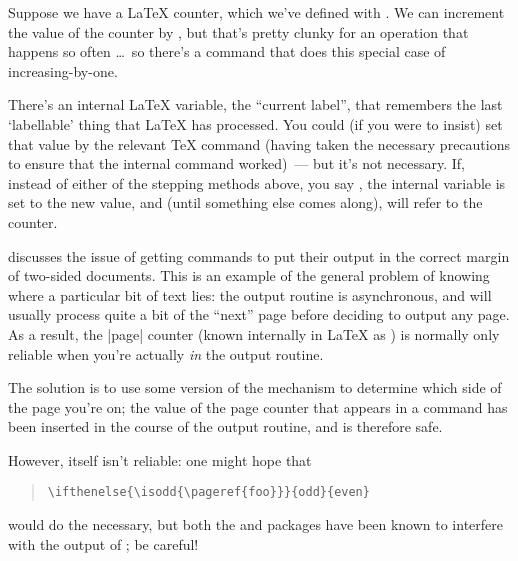 
Suppose we have a \LaTeX{} counter, which we've defined with
.  We can increment the value of the counter
by , but that's pretty clunky for an
operation that happens so often \dots{}~so there's a command
 that does this special case of
increasing-by-one.

There's an internal \LaTeX{} variable, the ``current label'', that
remembers the last `labellable' thing that \LaTeX{} has processed.
You could (if you were to insist) set that value by the relevant
\TeX{} command (having taken the necessary precautions to ensure that
the internal command worked)~--- but it's not necessary.  If, instead
of either of the stepping methods above, you say
, the internal variable is set to the
new value, and (until something else comes along),  will
refer to the counter.


 discusses the issue
of getting  commands to put their output in the correct
margin of two-sided documents.  This is an example of the general
problem of knowing where a particular bit of text lies: the output
routine is asynchronous, and \AllTeX{} will usually process quite a
bit of the ``next'' page before deciding to output any page.  As a
result, the |page| counter (known internally in \LaTeX{} as
) is normally only reliable when you're actually \emph{in}
the output routine.

The solution is to use some version of the  mechanism to
determine which side of the page you're on; the value of the page
counter that appears in a  command has been inserted in
the course of the output routine, and is therefore safe.

However,  itself isn't reliable: one might hope that
\begin{quote}
\begin{verbatim}
\ifthenelse{\isodd{\pageref{foo}}}{odd}{even}
\end{verbatim}
\end{quote}
would do the necessary, but both the  and
 packages have been known to interfere with the
output of ; be careful!

